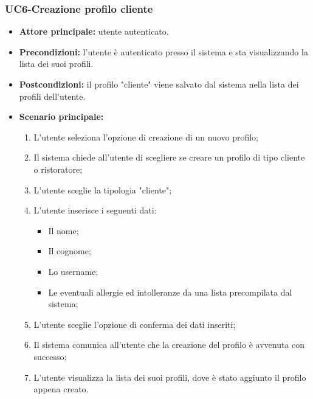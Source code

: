 \subsubsection{UC6-Creazione profilo cliente}
\begin{itemize}
    \item \textbf{Attore principale:} utente autenticato.
    \item \textbf{Precondizioni:} l'utente è autenticato presso il sistema e sta visualizzando
    la lista dei suoi profili.
    \item \textbf{Postcondizioni:} il profilo "cliente" viene salvato dal sistema nella lista dei profili
    dell'utente.
    \item \textbf{Scenario principale:}
    \begin{enumerate}
        \item L'utente seleziona l'opzione di creazione di un nuovo profilo;
        \item Il sistema chiede all'utente di scegliere se creare un profilo di tipo cliente
        o ristoratore;
        \item L'utente sceglie la tipologia "cliente";
        \item L'utente inserisce i seguenti dati:
        \begin{itemize}
            \item Il nome;
            \item Il cognome;
            \item Lo username;
            \item Le eventuali allergie ed intolleranze da una lista precompilata dal sistema;
        \end{itemize}
        \item L'utente sceglie l'opzione di conferma dei dati inseriti;
        \item Il sistema comunica all'utente che la creazione del profilo è avvenuta con successo;
        \item L'utente visualizza la lista dei suoi profili, dove è stato aggiunto il profilo appena creato.
    \end{enumerate}
\end{itemize}

